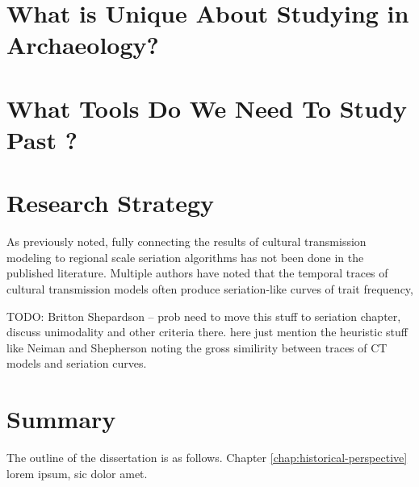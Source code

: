 \section{What is Unique About Studying \CT in Archaeology?}
\label{sec:ct-archy-different}



\section{What Tools Do We Need To Study Past \CT?}
\label{sec:ct-archy-questions}



\section{Research Strategy}
\label{sec:research-strategy}



As previously noted, fully connecting the results of cultural transmission modeling to regional scale seriation algorithms has not been done in the published literature.  Multiple authors \citep[e.g.][]{Lipo1997,Neiman1990,Neiman1995,shepardson2006} have noted that the temporal traces of cultural transmission models often produce seriation-like curves of trait frequency, 

TODO:
Britton Shepardson -- prob need to move this stuff to seriation chapter, discuss unimodality and other criteria there.  here just mention the heuristic stuff like Neiman and Shepherson noting the gross similirity between traces of CT models and seriation curves.



\section{Summary}
\label{sec:plan-of-book}

The outline of the dissertation is as follows. Chapter \ref{chap:historical-perspective} lorem ipsum, sic dolor amet.  

\lipsum[3]





